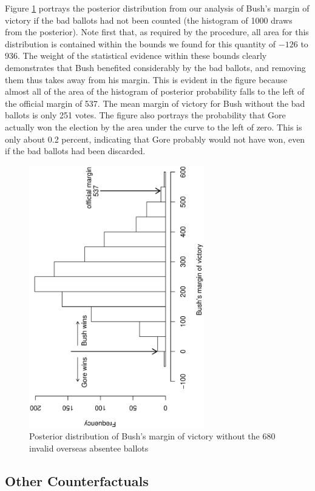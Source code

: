 \documentclass[11pt,titlepage]{article}
\begin{document}
Figure \ref{fg:margin} portrays the posterior distribution from our
analysis of Bush's margin of victory if the bad ballots had not been
counted (the histogram of 1000 draws from the posterior).  Note first
that, as required by the procedure, all area for this distribution is
contained within the bounds we found for this quantity of $-126$ to
936.  The weight of the statistical evidence within these bounds
clearly demonstrates that Bush benefited considerably by the bad
ballots, and removing them thus takes away from his margin.  This is
evident in the figure because almost all of the area of the histogram
of posterior probability falls to the left of the official margin of
537.  The mean margin of victory for Bush without the bad ballots is
only 251 votes.  The figure also portrays the probability that Gore
actually won the election by the area under the curve to the left of
zero.  This is only about 0.2 percent, indicating that Gore probably
would not have won, even if the bad ballots had been discarded.
\begin{figure}[t]
\begin{center}
\includegraphics[width=3in,height=4.5in,angle=-90]{margin}
\caption{Posterior distribution of Bush's margin of victory without the
  680 invalid overseas absentee ballots} \label{fg:margin}
\end{center} 
\end{figure}

\subsection{Other Counterfactuals}
\end{document}
